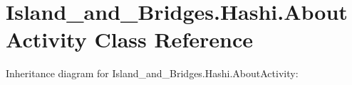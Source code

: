 \hypertarget{class_island__and___bridges_1_1_hashi_1_1_about_activity}{}\section{Island\+\_\+and\+\_\+\+Bridges.\+Hashi.\+About\+Activity Class Reference}
\label{class_island__and___bridges_1_1_hashi_1_1_about_activity}


Inheritance diagram for Island\+\_\+and\+\_\+\+Bridges.\+Hashi.\+About\+Activity\+:
